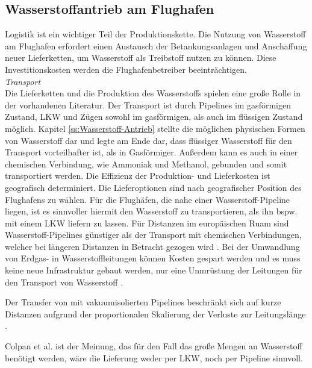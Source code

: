 \subsection{Wasserstoffantrieb am Flughafen}
Logistik ist ein wichtiger Teil der Produktionskette. 
Die Nutzung von Wasserstoff am Flughafen erfordert einen Austausch der 
Betankungsanlagen und Anschaffung neuer Lieferketten, 
um Wasserstoff als Treibstoff nutzen zu können. 
Diese Investitionskosten werden die Flughafenbetreiber beeinträchtigen.\\ %
\textit{Transport}\\
Die Lieferketten und die Produktion des Wasserstoffs spielen 
eine große Rolle in der vorhandenen Literatur.
Der Transport ist durch Pipelines im gasförmigen Zustand, 
LKW und Zügen sowohl im gasförmigen, als auch im flüssigen Zustand möglich. 
Kapitel \ref{ss:Wasserstoff-Antrieb} stellte die möglichen physischen Formen 
von Wasserstoff dar und legte am Ende dar, dass flüssiger Wasserstoff für 
den Transport vorteilhafter ist, als in Gasförmiger. 
Außerdem kann es auch in einer chemischen Verbindung, 
wie Ammoniak und Methanol, gebunden und somit transportiert werden.
%
%
%
% 
Die Effizienz der Produktion- und Lieferkosten ist geografisch determiniert. 
Die Lieferoptionen sind nach geografischer Position des Flughafens zu wählen. 
Für die Flughäfen, die nahe einer Wasserstoff-Pipeline liegen, ist es sinnvoller
hiermit den Wasserstoff zu transportieren, als ihn bspw. mit einem LKW liefern zu lassen.
%
Für Distanzen im europäischen Ruam sind Wasserstoff-Pipelines
günstiger als der Transport mit chemischen Verbindungen, 
welcher bei längeren Distanzen in Betracht gezogen wird \cite{undertaking2022strategic}. 
Bei der Umwandlung von Erdgas- in Wasserstoffleitungen können Kosten gespart
werden und es muss keine neue Infrastruktur gebaut werden, 
nur eine Unmrüstung der Leitungen für den Transport von Wasserstoff \cite{undertaking2022strategic}.

Der Transfer von  mit vakuumisolierten Pipelines beschränkt sich auf kurze Distanzen
aufgrund der proportionalen Skalierung der Verluste zur Leitungslänge \cite{colpan2022fuel}.

Colpan et al.\cite{colpan2022fuel} ist der Meinung, 
das für den Fall das große Mengen an Wasserstoff benötigt werden, 
wäre die Lieferung weder per LKW, noch per Pipeline sinnvoll. 

